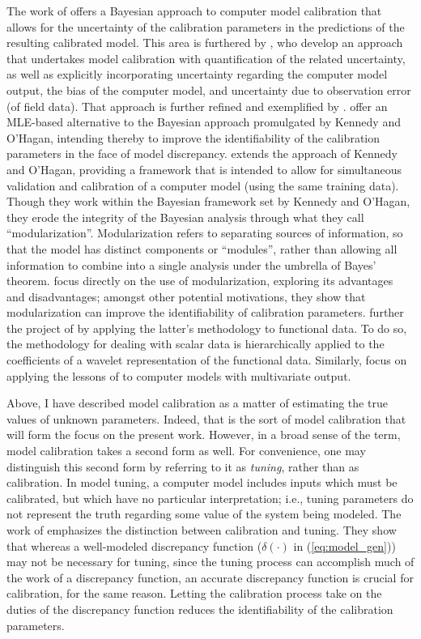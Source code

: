 \documentclass{article}
\begin{document}
The work of \cite{Kennedy2001} offers a Bayesian approach to computer model calibration that allows for the uncertainty of the calibration parameters in the predictions of the resulting calibrated model. This area is furthered by \cite{Higdon2004}, who develop an approach that undertakes model calibration with quantification of the related uncertainty, as well as explicitly incorporating uncertainty regarding the computer model output, the bias of the computer model, and uncertainty due to observation error (of field data). That approach is further refined and exemplified by \cite{Williams2006}.
\cite{Loeppky2006} offer an MLE-based alternative to the Bayesian approach promulgated by Kennedy and O'Hagan, intending thereby to improve the identifiability of the calibration parameters in the face of model discrepancy. 
\cite{Bayarri2007} extends the approach of Kennedy and O'Hagan, providing a framework that is intended to allow for simultaneous validation and calibration of a computer model (using the same training data). Though they  work within the Bayesian framework set by Kennedy and O'Hagan, they erode the integrity of the Bayesian analysis through what they call ``modularization''. Modularization refers to separating sources of information, so that the model has distinct components or ``modules'', rather than allowing all information to combine into a single analysis under the umbrella of Bayes' theorem. \cite{Liu2009} focus directly on the use of modularization, exploring its advantages and disadvantages; amongst other potential motivations, they show that modularization can improve the identifiability of calibration parameters. 
\cite{Bayarri} further the project of \cite{Bayarri2007} by applying the latter's methodology to functional data. To do so, the methodology for dealing with scalar data is hierarchically applied to the coefficients of a wavelet representation of the functional data. Similarly, \cite{Paulo2012} focus on applying the lessons of \cite{Bayarri2007} to computer models with multivariate output.

Above, I have described model calibration as a matter of estimating the true values of unknown parameters. Indeed, that is the sort of model calibration that will form the focus on the present work. However, in a broad sense of the term, model calibration takes a second form as well. For convenience, one may distinguish this second form by referring to it as \emph{tuning}, rather than as calibration. In model tuning, a computer model includes inputs which must be calibrated, but which have no particular interpretation; i.e., tuning parameters do not represent the truth regarding some value of the system being modeled. The work of \cite{Brynjarsdottir2014} emphasizes the distinction between calibration and tuning. They show that whereas a well-modeled discrepancy function ($\delta(\cdot)$ in (\ref{eq:model_gen})) may not be necessary for tuning, since the tuning process can accomplish much of the work of a discrepancy function, an accurate discrepancy function is crucial for calibration, for the same reason. Letting the calibration process take on the duties of the discrepancy function reduces the identifiability of the calibration parameters.
\end{document}
